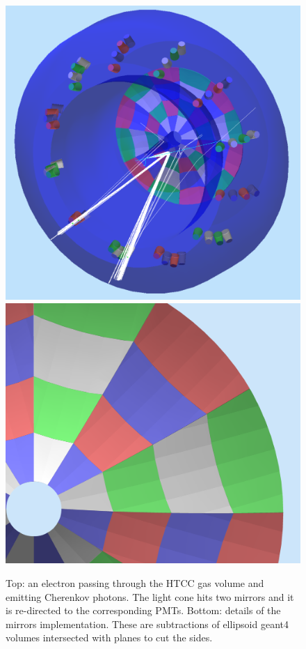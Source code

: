 \begin{figure}
	\centering
	\includegraphics[width=0.95\columnwidth,keepaspectratio]{img/htccGeometry.png}
	\includegraphics[width=0.95\columnwidth,keepaspectratio]{img/htccDetail.png}
	\caption{Top: an electron passing through the HTCC gas volume and emitting Cherenkov photons. The light cone
            hits two mirrors and it is re-directed to the corresponding PMTs.
            Bottom: details of the mirrors implementation. These are subtractions of ellipsoid geant4 volumes intersected
            with planes to cut the sides. }
	\label{fig:htccGeometry}
\end{figure}


